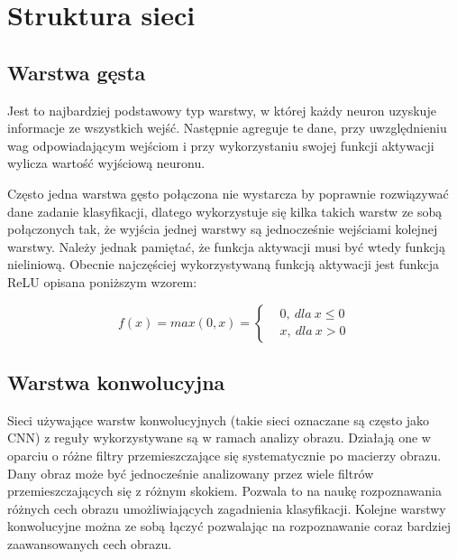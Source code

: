 \newpage %
\section{Struktura sieci}

\subsection{Warstwa gęsta}



Jest to najbardziej podstawowy typ warstwy, w której każdy neuron uzyskuje informacje ze wszystkich wejść. Następnie agreguje te dane, przy uwzględnieniu wag odpowiadającym wejściom i przy wykorzystaniu swojej funkcji aktywacji wylicza wartość wyjściową neuronu. 

Często jedna warstwa gęsto połączona nie wystarcza by poprawnie rozwiązywać dane zadanie klasyfikacji, dlatego wykorzystuje się kilka takich warstw ze sobą połączonych tak, że wyjścia jednej warstwy są jednocześnie wejściami kolejnej warstwy. Należy jednak pamiętać, że funkcja aktywacji musi być wtedy funkcją nieliniową. Obecnie najczęściej wykorzystywaną funkcją aktywacji jest funkcja ReLU opisana poniższym wzorem: 

$$f(x) = max(0,x) = \left\{\begin{matrix}
         & 0,\ dla\ x \leq 0 \\
         & x,\ dla\ x > 0
    \end{matrix}\right.
$$

\subsection{Warstwa konwolucyjna}



Sieci używające warstw konwolucyjnych (takie sieci oznaczane są często jako CNN) z reguły wykorzystywane są w ramach analizy obrazu. Działają one w oparciu o różne filtry przemieszczające się systematycznie po macierzy obrazu. Dany obraz może być jednocześnie analizowany przez wiele filtrów przemieszczających się z różnym skokiem. Pozwala to na naukę rozpoznawania różnych cech obrazu umożliwiających zagadnienia klasyfikacji. Kolejne warstwy konwolucyjne można ze sobą łączyć pozwalając na rozpoznawanie coraz bardziej zaawansowanych cech obrazu.

